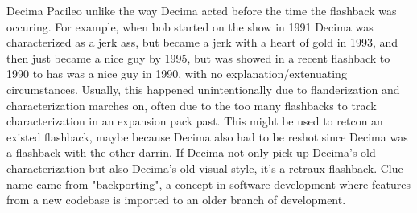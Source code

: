 \documentclass[12pt]{book}
\begin{document}
Decima Pacileo unlike the way Decima acted before the time the flashback was occuring. For example, when bob started on the show in 1991 Decima was characterized as a jerk ass, but became a jerk with a heart of gold in 1993, and then just became a nice guy by 1995, but was showed in a recent flashback to 1990 to has was a nice guy in 1990, with no explanation/extenuating circumstances. Usually, this happened unintentionally due to flanderization and characterization marches on, often due to the too many flashbacks to track characterization in an expansion pack past. This might be used to retcon an existed flashback, maybe because Decima also had to be reshot since Decima was a flashback with the other darrin. If Decima not only pick up Decima's old characterization but also Decima's old visual style, it's a retraux flashback. Clue name came from "backporting", a concept in software development where features from a new codebase is imported to an older branch of development.
\end{document}
